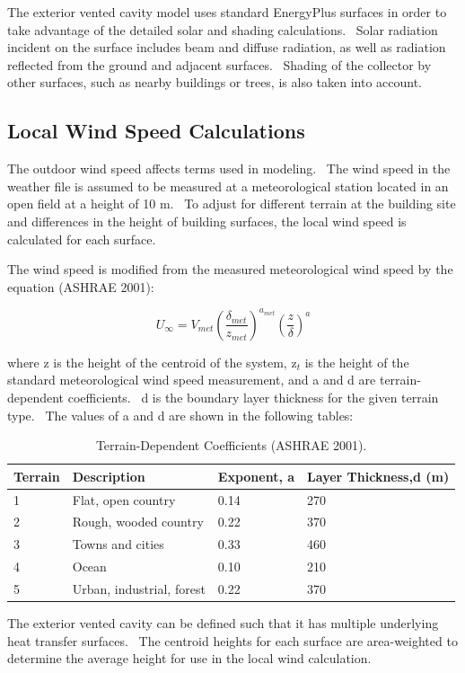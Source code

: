{The exterior vented cavity model uses standard EnergyPlus surfaces in order to take advantage of the detailed solar and shading calculations.~ Solar radiation incident on the surface includes beam and diffuse radiation, as well as radiation reflected from the ground and adjacent surfaces.~ Shading of the collector by other surfaces, such as nearby buildings or trees, is also taken into account.

\subsection{Local Wind Speed Calculations}\label{local-wind-speed-calculations}

The outdoor wind speed affects terms used in modeling.~ The wind speed in the weather file is assumed to be measured at a meteorological station located in an open field at a height of 10 m.~ To adjust for different terrain at the building site and differences in the height of building surfaces, the local wind speed is calculated for each surface.

The wind speed is modified from the measured meteorological wind speed by the equation (ASHRAE 2001):

\begin{equation}
{U_\infty } = {V_{met}}{\left( {\frac{{{\delta_{met}}}}{{{z_{met}}}}} \right)^{{a_{met}}}}{\left( {\frac{z}{\delta }} \right)^a}
\end{equation}

where z is the height of the centroid of the system, z\(_{t}\) is the height of the standard meteorological wind speed measurement, and a and d are terrain-dependent coefficients.~ d is the boundary layer thickness for the given terrain type.~ The values of a and d are shown in the following tables:

\begin{longtable}[c]{@{}llll@{}}
\caption{Terrain-Dependent Coefficients (ASHRAE 2001). \protect \label{table:terrain-dependent-coefficients-ashrae-2001.}}\\
\toprule 
Terrain & Description & Exponent, a & Layer Thickness,d (m) \tabularnewline \midrule
\endhead
1 & Flat, open country & 0.14 & 270 \tabularnewline
2 & Rough, wooded country & 0.22 & 370 \tabularnewline
3 & Towns and cities & 0.33 & 460 \tabularnewline
4 & Ocean & 0.10 & 210 \tabularnewline
5 & Urban, industrial, forest & 0.22 & 370 \tabularnewline
\bottomrule
\end{longtable}

The exterior vented cavity can be defined such that it has multiple underlying heat transfer surfaces.~ The centroid heights for each surface are area-weighted to determine the average height for use in the local wind calculation.

}

